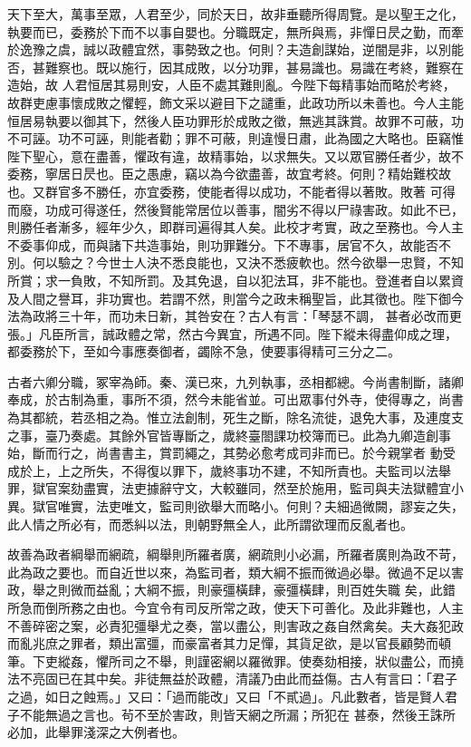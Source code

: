 \begin{pinyinscope}
 天下至大，萬事至眾，人君至少，同於天日，故非垂聽所得周覽。是以聖王之化，執要而已，委務於下而不以事自嬰也。分職既定，無所與焉，非憚日昃之勤，而牽於逸豫之虞，誠以政體宜然，事勢致之也。何則？夫造創謀始，逆闇是非，以別能否，甚難察也。既以施行，因其成敗，以分功罪，甚易識也。易識在考終，難察在造始，故
 人君恒居其易則安，人臣不處其難則亂。今陛下每精事始而略於考終，故群吏慮事懷成敗之懼輕，飾文采以避目下之譴重，此政功所以未善也。今人主能恒居易執要以御其下，然後人臣功罪形於成敗之徵，無逃其誅賞。故罪不可蔽，功不可誣。功不可誣，則能者勸；罪不可蔽，則違慢日肅，此為國之大略也。臣竊惟陛下聖心，意在盡善，懼政有違，故精事始，以求無失。又以眾官勝任者少，故不委務，寧居日昃也。臣之愚慮，竊以為今欲盡善，故宜考終。何則？精始難校故也。又群官多不勝任，亦宜委務，使能者得以成功，不能者得以著敗。敗著
 可得而廢，功成可得遂任，然後賢能常居位以善事，闇劣不得以尸祿害政。如此不已，則勝任者漸多，經年少久，即群司遍得其人矣。此校才考實，政之至務也。今人主不委事仰成，而與諸下共造事始，則功罪難分。下不專事，居官不久，故能否不別。何以驗之？今世士人決不悉良能也，又決不悉疲軟也。然今欲舉一忠賢，不知所賞；求一負敗，不知所罰。及其免退，自以犯法耳，非不能也。登進者自以累資及人間之譽耳，非功實也。若謂不然，則當今之政未稱聖旨，此其徵也。陛下御今法為政將三十年，而功未日新，其咎安在？古人有言：「琴瑟不調，
 甚者必改而更張。」凡臣所言，誠政體之常，然古今異宜，所遇不同。陛下縱未得盡仰成之理，都委務於下，至如今事應奏御者，蠲除不急，使要事得精可三分之二。



 古者六卿分職，冢宰為師。秦、漢已來，九列執事，丞相都總。今尚書制斷，諸卿奉成，於古制為重，事所不須，然今未能省並。可出眾事付外寺，使得專之，尚書為其都統，若丞相之為。惟立法創制，死生之斷，除名流徙，退免大事，及連度支之事，臺乃奏處。其餘外官皆專斷之，歲終臺閤課功校簿而已。此為九卿造創事始，斷而行之，尚書書主，賞罰繩之，其勢必愈考成司非而已。於今親掌者
 動受成於上，上之所失，不得復以罪下，歲終事功不建，不知所責也。夫監司以法舉罪，獄官案劾盡實，法吏據辭守文，大較雖同，然至於施用，監司與夫法獄體宜小異。獄官唯實，法吏唯文，監司則欲舉大而略小。何則？夫細過微闕，謬妄之失，此人情之所必有，而悉糾以法，則朝野無全人，此所謂欲理而反亂者也。



 故善為政者綱舉而網疏，綱舉則所羅者廣，網疏則小必漏，所羅者廣則為政不苛，此為政之要也。而自近世以來，為監司者，類大綱不振而微過必舉。微過不足以害政，舉之則微而益亂；大綱不振，則豪彊橫肆，豪彊橫肆，則百姓失職
 矣，此錯所急而倒所務之由也。今宜令有司反所常之政，使天下可善化。及此非難也，人主不善碎密之案，必責犯彊舉尤之奏，當以盡公，則害政之姦自然禽矣。夫大姦犯政而亂兆庶之罪者，類出富彊，而豪富者其力足憚，其貨足欲，是以官長顧勢而頓筆。下吏縱姦，懼所司之不舉，則謹密網以羅微罪。使奏劾相接，狀似盡公，而撓法不亮固已在其中矣。非徒無益於政體，清議乃由此而益傷。古人有言曰：「君子之過，如日之蝕焉。」又曰：「過而能改」又曰「不貳過」。凡此數者，皆是賢人君子不能無過之言也。茍不至於害政，則皆天網之所漏；所犯在
 甚泰，然後王誅所必加，此舉罪淺深之大例者也。




\end{pinyinscope}
